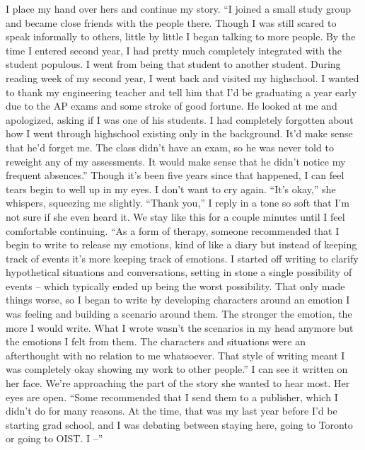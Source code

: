 \documentclass[a4paper, 12pt]{book}
\newcommand\tab[1][1cm]{\hspace*{#1}}
\begin{document}
\newline
\tab
I place my hand over hers and continue my story. “I joined a small study group and became close friends with the people there. Though I was still scared to speak informally to others, little by little I began talking to more people. By the time I entered second year, I had pretty much completely integrated with the student populous. I went from being that student to another student. During reading week of my second year, I went back and visited my highschool. I wanted to thank my engineering teacher and tell him that I’d be graduating a year early due to the AP exams and some stroke of good fortune. He looked at me and apologized, asking if I was one of his students. I had completely forgotten about how I went through highschool existing only in the background. It’d make sense that he’d forget me. The class didn’t have an exam, so he was never told to reweight any of my assessments. It would make sense that he didn’t notice my frequent absences.” Though it’s been five years since that happened, I can feel tears begin to well up in my eyes. I don’t want to cry again.
\newline
\tab
“It’s okay,” she whispers, squeezing me slightly.
\newline
\tab
“Thank you,” I reply in a tone so soft that I’m not sure if she even heard it. We stay like this for a couple minutes until I feel comfortable continuing. “As a form of therapy, someone recommended that I begin to write to release my emotions, kind of like a diary but instead of keeping track of events it’s more keeping track of emotions. I started off writing to clarify hypothetical situations and conversations, setting in stone a single possibility of events – which typically ended up being the worst possibility. That only made things worse, so I began to write by developing characters around an emotion I was feeling and building a scenario around them. The stronger the emotion, the more I would write. What I wrote wasn’t the scenarios in my head anymore but the emotions I felt from them. The characters and situations were an afterthought with no relation to me whatsoever. That style of writing meant I was completely okay showing my work to other people.” I can see it written on her face. We’re approaching the part of the story she wanted to hear most. Her eyes are open.
\newline
\tab
“Some recommended that I send them to a publisher, which I didn’t do for many reasons. At the time, that was my last year before I’d be starting grad school, and I was debating between staying here, going to Toronto or going to OIST. I –”
\end{document}
